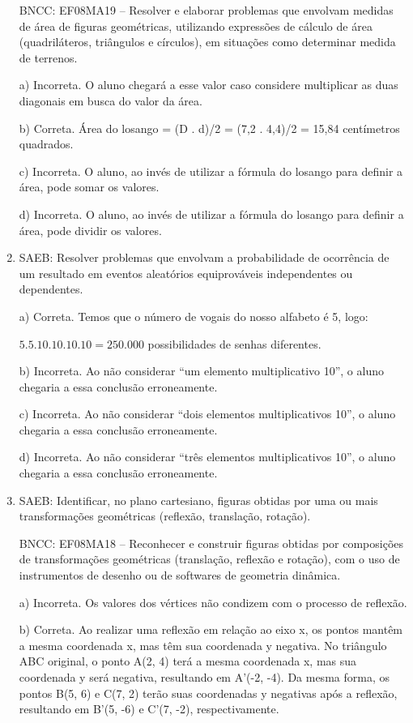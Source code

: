 \begin{enumerate}
BNCC: EF08MA19 -- Resolver e elaborar problemas que envolvam medidas de
área de figuras geométricas, utilizando expressões de cálculo de área
(quadriláteros, triângulos e círculos), em situações como determinar
medida de terrenos.

a) Incorreta. O aluno chegará a esse valor caso considere
multiplicar as duas diagonais em busca do valor da área.

b) Correta. Área do losango = (D . d)/2 = (7,2 . 4,4)/2 = 15,84 centímetros quadrados.

c) Incorreta. O aluno, ao invés de utilizar a fórmula do losango
para definir a área, pode somar os valores.

d) Incorreta. O aluno, ao invés de utilizar a fórmula do losango
para definir a área, pode dividir os valores.

\item SAEB: Resolver problemas que envolvam a probabilidade de ocorrência de
um resultado em eventos aleatórios equiprováveis independentes ou
dependentes.

a) Correta. Temos que o número de vogais do nosso alfabeto é 5,
logo:

$5 . 5 . 10 . 10 . 10 . 10 = 250.000$ possibilidades de senhas diferentes.

b) Incorreta. Ao não considerar ``um elemento multiplicativo 10'',
o aluno chegaria a essa conclusão erroneamente.

c) Incorreta. Ao não considerar ``dois elementos multiplicativos
10'', o aluno chegaria a essa conclusão erroneamente.

d) Incorreta. Ao não considerar ``três elementos multiplicativos
10'', o aluno chegaria a essa conclusão erroneamente.

\item SAEB: Identificar, no plano cartesiano, figuras obtidas por uma ou mais
transformações geométricas (reflexão, translação, rotação).

BNCC: EF08MA18 -- Reconhecer e construir figuras obtidas por composições
de transformações geométricas (translação, reflexão e rotação), com o
uso de instrumentos de desenho ou de softwares de geometria dinâmica.

a) Incorreta. Os valores dos vértices não condizem com o processo
de reflexão.

b) Correta. Ao realizar uma reflexão em relação ao eixo x, os
pontos mantêm a mesma coordenada x, mas têm sua coordenada y negativa.
No triângulo ABC original, o ponto A(2, 4) terá a mesma coordenada x,
mas sua coordenada y será negativa, resultando em A'(-2, -4). Da mesma
forma, os pontos B(5, 6) e C(7, 2) terão suas coordenadas y negativas
após a reflexão, resultando em B'(5, -6) e C'(7, -2), respectivamente.


\end{enumerate}
